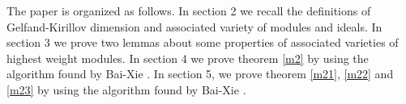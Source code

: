 \documentclass{amsart}[12pt]
\newtheorem{Thm}[Lem]{Theorem}
\numberwithin{equation}{section}
\begin{document}
%
%
%
%




The paper is organized as follows. In section 2 we recall the definitions of Gelfand-Kirillov dimension and associated variety of modules and ideals. In section 3 we prove two lemmas about some properties of associated varieties of highest weight modules.
In section 4 we prove theorem \ref{m2} by using the algorithm found by Bai-Xie \cite{BX}.
In section 5, we prove theorem \ref{m21}, \ref{m22} and \ref{m23} by using the algorithm found by Bai-Xie \cite{BX-2}.
\end{document}
